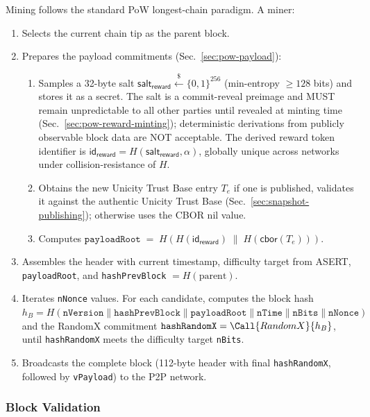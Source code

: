 Mining follows the standard PoW longest-chain paradigm. A miner:
\begin{enumerate}[nosep]
  \item Selects the current chain tip as the parent block.
  \item Prepares the payload commitments (Sec.~\ref{sec:pow-payload}):
    \begin{enumerate}[nosep]
      \item Samples a 32-byte salt $\mathsf{salt}_\mathsf{reward} \overset{\$}{\leftarrow} \{0,1\}^{256}$ (min-entropy $\ge 128$ bits) and stores it as a secret. The salt is a commit-reveal preimage and MUST remain unpredictable to all other parties until revealed at minting time (Sec.~\ref{sec:pow-reward-minting}); deterministic derivations from publicly observable block data are NOT acceptable. The derived reward token identifier is $\mathsf{id}_\mathsf{reward} = H(\mathsf{salt}_\mathsf{reward}, \alpha)$, globally unique across networks under collision-resistance of $H$.
      \item Obtains the new Unicity Trust Base entry $T_e$ if one is published, validates it against the authentic Unicity Trust Base (Sec.~\ref{sec:snapshot-publishing}); otherwise uses the CBOR nil value.
      \item Computes $\texttt{payloadRoot} \;=\; H(H(\mathsf{id}_\mathsf{reward}) \;\|\; H(\mathsf{cbor}(T_e)))$.
    \end{enumerate}
  \item Assembles the header with current timestamp, difficulty target from ASERT, \texttt{payloadRoot}, and \texttt{hashPrevBlock} $= H(\text{parent})$.
  \item Iterates \texttt{nNonce} values. For each candidate, computes the block hash $h_B = H(\texttt{nVersion} \| \texttt{hashPrevBlock} \| \texttt{payloadRoot} \| \texttt{nTime} \| \texttt{nBits} \| \texttt{nNonce})$ and the RandomX commitment $\texttt{hashRandomX} = \Call{RandomX}{h_B}$, until \texttt{hashRandomX} meets the difficulty target \texttt{nBits}.
  \item Broadcasts the complete block (112-byte header with final \texttt{hashRandomX}, followed by \texttt{vPayload}) to the P2P network.
\end{enumerate}


\subsubsection{Block Validation}\label{sec:pow-block-validation}

